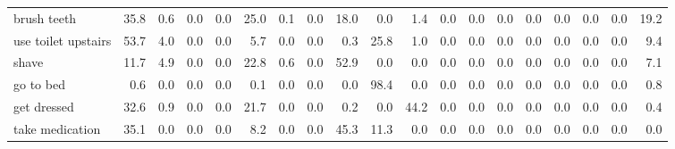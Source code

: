 \documentclass{article}
\begin{document}
\begin{sideways}
\begin{tabular}{lrrrrrrrrrrrrrrrrrr}
brush teeth                   &        35.8 &                0.6 &           0.0 &                          0.0 &               25.0 &                0.1 &                        0.0 &         18.0 &              0.0 &                1.4 &                    0.0 &                      0.0 &                  0.0 &                   0.0 &              0.0 &              0.0 &                                  0.0 &         19.2 \\
use toilet upstairs           &        53.7 &                4.0 &           0.0 &                          0.0 &                5.7 &                0.0 &                        0.0 &          0.3 &             25.8 &                1.0 &                    0.0 &                      0.0 &                  0.0 &                   0.0 &              0.0 &              0.0 &                                  0.0 &          9.4 \\
shave                         &        11.7 &                4.9 &           0.0 &                          0.0 &               22.8 &                0.6 &                        0.0 &         52.9 &              0.0 &                0.0 &                    0.0 &                      0.0 &                  0.0 &                   0.0 &              0.0 &              0.0 &                                  0.0 &          7.1 \\
go to bed                     &         0.6 &                0.0 &           0.0 &                          0.0 &                0.1 &                0.0 &                        0.0 &          0.0 &             98.4 &                0.0 &                    0.0 &                      0.0 &                  0.0 &                   0.0 &              0.0 &              0.0 &                                  0.0 &          0.8 \\
get dressed                   &        32.6 &                0.9 &           0.0 &                          0.0 &               21.7 &                0.0 &                        0.0 &          0.2 &              0.0 &               44.2 &                    0.0 &                      0.0 &                  0.0 &                   0.0 &              0.0 &              0.0 &                                  0.0 &          0.4 \\
take medication               &        35.1 &                0.0 &           0.0 &                          0.0 &                8.2 &                0.0 &                        0.0 &         45.3 &             11.3 &                0.0 &                    0.0 &                      0.0 &                  0.0 &                   0.0 &              0.0 &              0.0 &                                  0.0 &          0.0 \\

\end{tabular}
\end{sideways}
\end{document}
